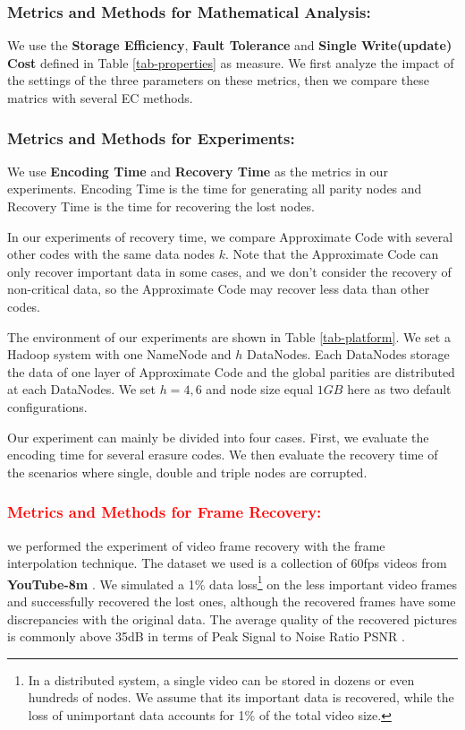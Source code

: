 \documentclass[sigconf]{acmart}
\begin{document}
\subsubsection{Metrics and Methods for Mathematical Analysis: }
We use the \textbf{Storage Efficiency}, \textbf{Fault Tolerance} and \textbf{Single Write(update) Cost} defined in Table \ref{tab-properties} as measure.
We first analyze the impact of the settings of the three parameters on these metrics, then we compare these matrics with several EC methods.

\subsubsection{Metrics and Methods for Experiments: }
We use \textbf{Encoding Time} and \textbf{Recovery Time} as the metrics in our experiments. Encoding Time is the time for generating all parity nodes and Recovery Time is the time for recovering the lost nodes.

In our experiments of recovery time, we compare Approximate Code with several other codes with the same data nodes $k$.
Note that the Approximate Code can only recover important data in some cases, and we don't consider the recovery of non-critical data, so the Approximate Code may recover less data than other codes.

The environment of our experiments are shown in Table \ref{tab-platform}. We set a Hadoop system with one NameNode and $h$ DataNodes. Each DataNodes storage the data of one layer of Approximate Code and the global parities are distributed at each DataNodes. We set $h=4,6$ and node size equal $1GB$ here as two default configurations.

Our experiment can mainly be divided into four cases. First, we evaluate the encoding time for several erasure codes. We then evaluate the recovery time of the scenarios where single, double and triple nodes are corrupted.

\subsubsection{\textcolor{red}{Metrics and Methods for Frame Recovery: }}
we performed the experiment of video frame recovery with the frame interpolation technique. The dataset we used is a collection of 60fps videos from \textbf{YouTube-8m} \cite{youtube8m}. We simulated a 1\% data loss\footnote{In a distributed system, a single video can be stored in dozens or even hundreds of nodes. We assume that its important data is recovered, while the loss of unimportant data accounts for 1\% of the total video size.} on the less important video frames and successfully recovered the lost ones, although the recovered frames have some discrepancies with the original data. The average quality of the recovered pictures is commonly above 35dB in terms of Peak Signal to Noise Ratio PSNR .
\end{document}
